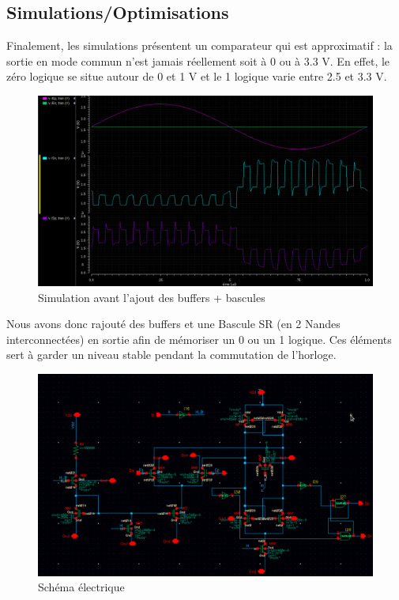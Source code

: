 \documentclass[11pt]{article}
\begin{document}
\subsection{Simulations/Optimisations}

Finalement, les simulations pr\'esentent un comparateur qui est approximatif : la sortie en mode
commun n'est jamais r\'eellement soit \`a 0 ou \`a 3.3 V. En effet, le z\'ero logique se situe autour de 0 et 1 V
et le 1 logique varie entre 2.5 et 3.3 V. 

\begin{figure}[!htb]
      \centering
      \includegraphics[width=0.8\linewidth]{simu_comp_pas_ameliore.png}
      \caption{Simulation avant l'ajout des buffers + bascules}
      \label{fig:sfigBSRFF}
\end{figure}%

Nous avons donc rajout\'e des buffers et une Bascule SR (en 2 Nandes interconnect\'ees) en sortie afin de m\'emoriser un 0 ou un 1 logique. Ces \'el\'ements sert \`a garder un niveau stable pendant la commutation de l'horloge.

\begin{figure}[!htb]
      \centering
      \includegraphics[width=0.9\linewidth]{comparateur_schema_cadence_SR.png}
      \caption{Sch\'ema \'electrique}
      \label{fig:schcompSR}
\end{figure}%
\end{document}
